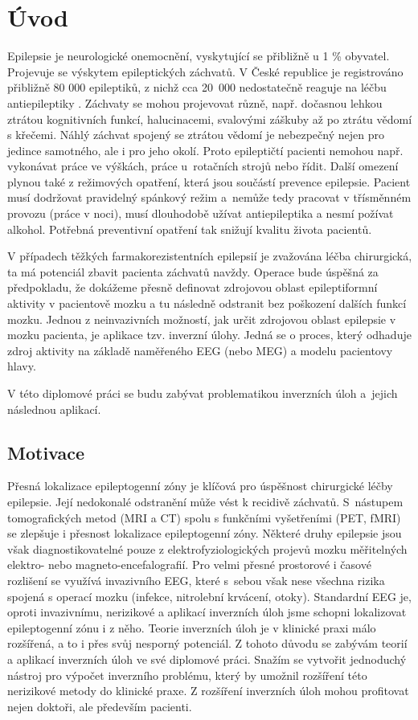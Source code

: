 
\chapter{Úvod}
Epilepsie je neurologické onemocnění, vyskytující se přibližně u 1 \% obyvatel. Projevuje se výskytem epileptických záchvatů. V České republice je registrováno přibližně 80 000 epileptiků, z nichž cca 20~000 nedostatečně reaguje na léčbu antiepileptiky \cite{58, 57}. Záchvaty se mohou projevovat různě, např. dočasnou lehkou ztrátou kognitivních funkcí, halucinacemi, svalovými záškuby až po ztrátu vědomí s křečemi. Náhlý záchvat spojený se ztrátou vědomí je nebezpečný nejen pro jedince samotného, ale i pro jeho okolí. Proto epileptičtí pacienti nemohou např. vykonávat práce ve výškách, práce u~rotačních strojů nebo řídit. Další omezení plynou také z režimových opatření, která jsou součástí prevence epilepsie. Pacient musí dodržovat pravidelný spánkový režim a~nemůže tedy pracovat v třísměnném provozu (práce v noci), musí dlouhodobě užívat antiepileptika a nesmí požívat alkohol. Potřebná preventivní opatření tak snižují kvalitu života pacientů.

V případech těžkých farmakorezistentních epilepsií je zvažována léčba chirurgická, ta má potenciál zbavit pacienta záchvatů navždy. Operace bude úspěšná za předpokladu, že dokážeme přesně definovat zdrojovou oblast epileptiformní aktivity v pacientově mozku a tu následně odstranit bez poškození dalších funkcí mozku.
Jednou z neinvazivních možností, jak určit zdrojovou oblast epilepsie v mozku pacienta, je aplikace tzv. inverzní úlohy. Jedná se o proces, který odhaduje zdroj aktivity na základě naměřeného EEG (nebo MEG) a modelu pacientovy hlavy. 

V této diplomové práci se budu zabývat problematikou inverzních úloh a~jejich následnou aplikací. 

\section{Motivace}
Přesná lokalizace epileptogenní zóny je klíčová pro úspěšnost chirurgické léčby epilepsie. Její nedokonalé odstranění může vést k recidivě záchvatů. S~nástupem tomografických metod (MRI a CT) spolu s funkčními vyšetřeními (PET, fMRI) se zlepšuje i přesnost lokalizace epileptogenní zóny. Některé druhy epilepsie jsou však diagnostikovatelné pouze z elektrofyziologických projevů mozku měřitelných elektro- nebo magneto-encefalografií. Pro velmi přesné prostorové i časové rozlišení se využívá invazivního EEG, které s~sebou však nese všechna rizika spojená s operací mozku (infekce, nitrolební krvácení, otoky). Standardní EEG je, oproti invazivnímu, nerizikové a aplikací inverzních úloh jsme schopni lokalizovat epileptogenní zónu i z něho. Teorie inverzních úloh je v klinické praxi málo rozšířená, a to i přes svůj nesporný potenciál. Z tohoto důvodu se zabývám teorií a aplikací inverzních úloh ve své diplomové práci. Snažím se vytvořit jednoduchý nástroj pro výpočet inverzního problému, který by umožnil rozšíření této nerizikové metody do klinické praxe. Z rozšíření inverzních úloh mohou profitovat nejen doktoři, ale především pacienti.


